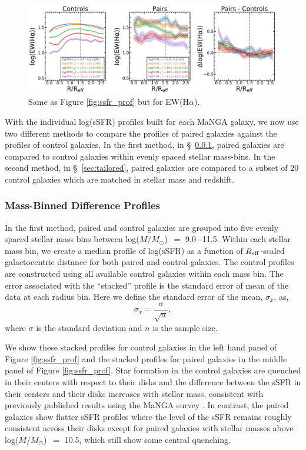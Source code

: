 \documentclass[apj,twocolumn]{emulateapj}
\newcommand{\reff}{$R_{\rm eff}$}
\newcommand{\logm}{log($M/M_{\odot}$)}
\begin{document}
\begin{CJK*}{UTF8}{gbsn}
\begin{figure}
\centering
\includegraphics[width=\linewidth]{ewha_comb.pdf}
\caption[]{Same as Figure \ref{fig:ssfr_prof} but for EW(H$\alpha$). }
\label{fig:ewha_prof}
\end{figure}

With the individual log(sSFR) profiles built for each MaNGA galaxy, we now use two different methods to compare the profiles of paired galaxies against the profiles of control galaxies. In the first method, in \S~\ref{sec:mass-bin}, paired galaxies are compared to control galaxies within evenly spaced stellar mass-bins. In the second method, in \S~\ref{sec:tailored}, paired galaxies are compared to a subset of 20 control galaxies which are matched in stellar mass and redshift. 

\subsubsection{Mass-Binned Difference Profiles}\label{sec:mass-bin}

In the first method, paired and control galaxies are grouped into five evenly spaced stellar mass bins between \logm\ $=$ 9.0$-$11.5. Within each stellar mass bin, we create a median profile of log(sSFR) as a function of \reff-scaled galactocentric distance for both paired and control galaxies. The control profiles are constructed using all available control galaxies within each mass bin. The error associated with the ``stacked'' profile is the standard error of mean of the data at each radius bin. Here we define the standard error of the mean, $\sigma_{\overline{x}}$, as,
\begin{equation}
\sigma_{\overline{x}} = \frac{\sigma}{\sqrt{n}},
\end{equation}
where $\sigma$ is the standard deviation and $n$ is the sample size.

We show these stacked profiles for control galaxies in the left hand panel of Figure \ref{fig:ssfr_prof} and the stacked profiles for paired galaxies in the middle panel of Figure \ref{fig:ssfr_prof}. Star formation in the control galaxies are quenched in their centers with respect to their disks and the difference between the sSFR in their centers and their disks increases with stellar mass, consistent with previously published results using the MaNGA survey \citep{Belfiore:2018}. In contrast, the paired galaxies show flatter sSFR profiles where the level of the sSFR remains roughly consistent across their disks except for paired galaxies with stellar masses above \logm\ $=$ 10.5, which still show some central quenching. 


\end{CJK*}
\end{document}
